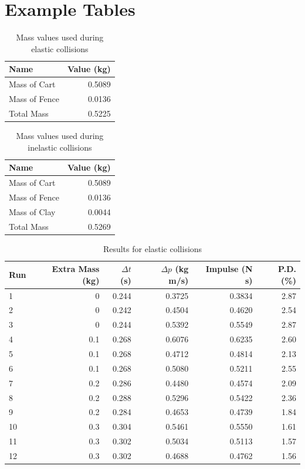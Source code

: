 \section{Example Tables}
%
\begin{table}[ht]
    \centering
    \begin{tabular}{l|r}
        \textbf{Name} & \textbf{Value} (kg) \\
        \hline
        Mass of Cart & 0.5089 \\
        Mass of Fence & 0.0136 \\
        \hline
        Total Mass & 0.5225 \\
        \hline
    \end{tabular}
    \caption{Mass values used during elastic collisions}
    \label{table:08.mass.elastic}
\end{table}
%
\begin{table}[ht]
    \centering
    \begin{tabular}{l|r}
        \textbf{Name} & \textbf{Value} (kg) \\
        \hline
        Mass of Cart & 0.5089 \\
        Mass of Fence & 0.0136 \\
        Mass of Clay & 0.0044 \\
        \hline
        Total Mass & 0.5269 \\
        \hline
    \end{tabular}
    \caption{Mass values used during inelastic collisions}
    \label{table:08.mass.inelastic}
\end{table}
%
\begin{table}[ht]
    \centering
    \begin{tabular}{l|r|r|r|r|r}
        \textbf{Run} & \textbf{Extra Mass} (kg) & $\Delta t$ (s) & $\Delta p$ (kg m/s) & \textbf{Impulse} (N s) & \textbf{P.D.} (\%) \\  
        \hline
        1 & 0 & 0.244 & 0.3725 & 0.3834 & 2.87 \\
        2 & 0 & 0.242 & 0.4504 & 0.4620 & 2.54 \\
        3 & 0 & 0.244 & 0.5392 & 0.5549 & 2.87 \\
        \hline
        4 & 0.1 & 0.268 & 0.6076 & 0.6235 & 2.60 \\
        5 & 0.1 & 0.268 & 0.4712 & 0.4814 & 2.13 \\
        6 & 0.1 & 0.268 & 0.5080 & 0.5211 & 2.55 \\
        \hline
        7 & 0.2 & 0.286 & 0.4480 & 0.4574 & 2.09 \\
        8 & 0.2 & 0.288 & 0.5296 & 0.5422 & 2.36 \\
        9 & 0.2 & 0.284 & 0.4653 & 0.4739 & 1.84 \\
        \hline
        10 & 0.3 & 0.304 & 0.5461 & 0.5550 & 1.61 \\
        11 & 0.3 & 0.302 & 0.5034 & 0.5113 & 1.57 \\
        12 & 0.3 & 0.302 & 0.4688 & 0.4762 & 1.56 \\
        \hline
    \end{tabular}
    \caption{Results for elastic collisions}
    \label{table:08.results.elastic}
\end{table}

